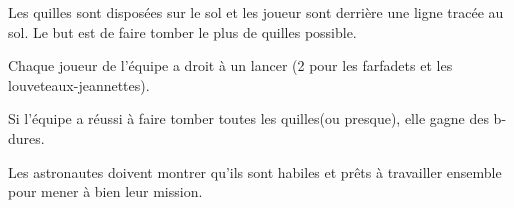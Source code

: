 \documentclass{grand-jeu}
\begin{document}
\begin{liste-materiel}
\end{liste-materiel}

\begin{regles}
Les quilles sont disposées sur le sol et les joueur sont derrière une ligne tracée au sol.
Le but est de faire tomber le plus de quilles possible.

Chaque joueur de l'équipe a droit à un lancer (2 pour les farfadets et les louveteaux-jeannettes).

Si l'équipe a réussi à faire tomber toutes les quilles(ou presque), elle gagne des b-dures.
 
\end{regles}

\begin{imaginaire}
Les astronautes doivent montrer qu'ils sont habiles et prêts à travailler ensemble pour mener à bien leur mission.  
\end{imaginaire}

\begin{moments-stop}
\end{moments-stop}
\end{document}
